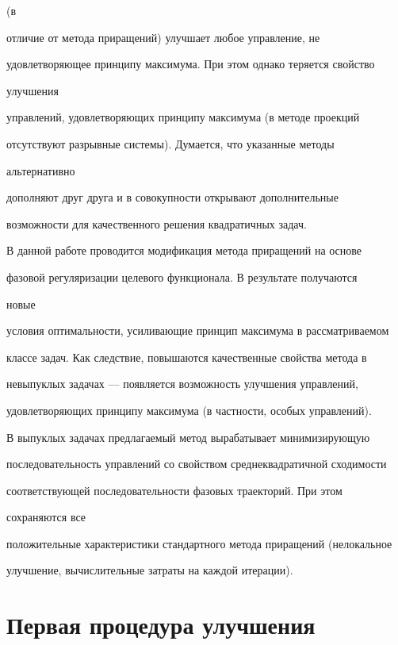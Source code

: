 (в 


отличие от метода приращений) улучшает любое управление, не 


удовлетворяющее принципу максимума. При этом однако теряется свойство 


улучшения 


управлений, удовлетворяющих принципу максимума (в методе проекций 


отсутствуют разрывные системы). Думается, что указанные методы 


альтернативно 


дополняют друг друга и в совокупности открывают дополнительные 


возможности для качественного решения квадратичных задач. 


 


В данной работе проводится модификация метода приращений на основе 


фазовой регуляризации целевого функционала. В результате получаются 


новые 


условия оптимальности, усиливающие принцип максимума в рассматриваемом 


классе задач. Как следствие, повышаются качественные свойства метода в 


невыпуклых задачах --- появляется возможность улучшения управлений, 


удовлетворяющих принципу максимума (в частности, особых управлений). 


В выпуклых задачах предлагаемый метод вырабатывает минимизирующую 


последовательность управлений со свойством среднеквадратичной сходимости 


соответствующей последовательности фазовых траекторий. При этом 


сохраняются все 


положительные характеристики стандартного метода приращений (нелокальное 


улучшение, вычислительные затраты на каждой итерации). 


 


\section{Первая процедура улучшения} 


 


